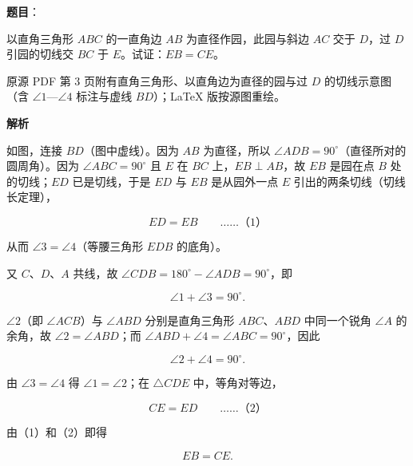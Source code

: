 \begin{answer}

\textbf{题目}：

以直角三角形 $ABC$ 的一直角边 $AB$ 为直径作园，此园与斜边 $AC$ 交于 $D$，过 $D$ 引园的切线交 $BC$ 于 $E$。试证：$EB=CE$。

\begin{gktip}
原源 PDF 第 3 页附有直角三角形、以直角边为直径的园与过 $D$ 的切线示意图（含 $\angle1$—$\angle4$ 标注与虚线 $BD$）；LaTeX 版按源图重绘。
\end{gktip}
\nopagebreak[4]
\begin{center}\end{center}
\nopagebreak[4]
\textbf{解析}
\nopagebreak[4]
\begin{center}\end{center}
\nopagebreak[4]
如图，连接 $BD$（图中虚线）。因为 $AB$ 为直径，所以 $\angle ADB=90^{\circ}$（直径所对的圆周角）。因为 $\angle ABC=90^{\circ}$ 且 $E$ 在 $BC$ 上，$EB\perp AB$，故 $EB$ 是园在点 $B$ 处的切线；$ED$ 已是切线，于是 $ED$ 与 $EB$ 是从园外一点 $E$ 引出的两条切线（切线长定理），

\nopagebreak[4]
\[
ED=EB\qquad\text{……（1）}
\]

从而 $\angle3=\angle4$（等腰三角形 $EDB$ 的底角）。

又 $C$、$D$、$A$ 共线，故 $\angle CDB=180^{\circ}-\angle ADB=90^{\circ}$，即

\nopagebreak[4]
\[
\angle1+\angle3=90^{\circ}.
\]

$\angle2$（即 $\angle ACB$）与 $\angle ABD$ 分别是直角三角形 $ABC$、$ABD$ 中同一个锐角 $\angle A$ 的余角，故 $\angle2=\angle ABD$；而 $\angle ABD+\angle4=\angle ABC=90^{\circ}$，因此

\nopagebreak[4]
\[
\angle2+\angle4=90^{\circ}.
\]

由 $\angle3=\angle4$ 得 $\angle1=\angle2$；在 $\triangle CDE$ 中，等角对等边，

\nopagebreak[4]
\[
CE=ED\qquad\text{……（2）}
\]

由（1）和（2）即得

\nopagebreak[4]
\[
EB=CE.
\]


\end{answer}
